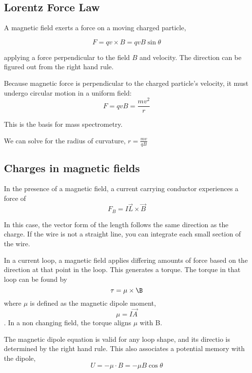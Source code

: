 \documentclass{article}
\begin{document}
\subsection{Lorentz Force Law}

A magnetic field exerts a force on a moving charged particle,

$$F=q v \times B=qvB\sin{\theta}$$

applying a force perpendicular to the field $B$ and velocity. The direction can be figured out from the right hand rule.

Because magnetic force is perpendicular to the charged particle's velocity, it must undergo circular motion in a uniform field:
$$F=qvB=\frac{mv^2}{r}$$

This is the basis for mass spectrometry.

We can solve for the radius of curvature, $r=\frac{mv}{qB}$

\subsection{Charges in magnetic fields}

In the presence of a magnetic field, a current carrying conductor experiences a force of $$F_B=I \vec{L}\times\vec{B}$$

In this case, the vector form of the length follows the same direction as the charge.
If the wire is not a straight line, you can integrate each small section of the wire.

In a current loop, a magnetic field applies differing amounts of force based on the direction at that point in the loop. This generates a torque. The torque in that loop
can be found by $$\tau=\mu\times\B$$ where $\mu$ is defined as the magnetic dipole moment, $$\mu=I\vec{A}$$. In a non changing field, the torque aligns $\mu$ with B.

The magnetic dipole equation is valid for any loop shape, and its directio is determined by the right hand rule. This also associates a potential memory with the dipole, 
$$U=-\mu\cdot B=-\mu B \cos{\theta}$$
\end{document}
